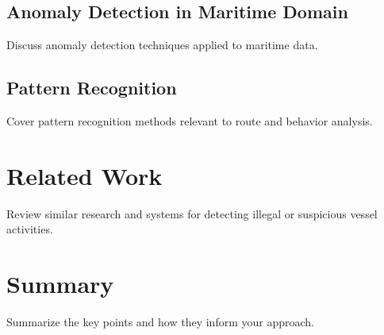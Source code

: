 \subsection{Anomaly Detection in Maritime Domain}
Discuss anomaly detection techniques applied to maritime data.

\subsection{Pattern Recognition}
Cover pattern recognition methods relevant to route and behavior analysis.

\section{Related Work}
Review similar research and systems for detecting illegal or suspicious vessel activities.

\section{Summary}
Summarize the key points and how they inform your approach.
